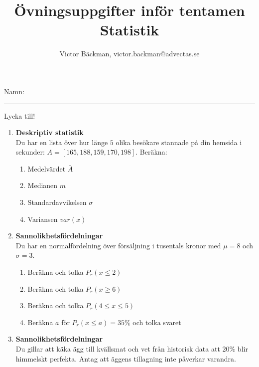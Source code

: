 \documentclass[a4paper,10pt]{article}
\title{Övningsuppgifter inför tentamen\\ Statistik}
\author{Victor Bäckman, victor.backman@advectas.se}
\begin{document}
\maketitle
\vspace{2cm}
Namn:
{\rule{13cm}{0.4pt}}
\vspace{5cm}
\begin{center}
  {\huge Lycka till!}
\end{center}

\newpage
\begin{enumerate}
    \item{{\bf Deskriptiv statistik} \\ Du har en lista över hur länge $5$ olika besökare stannade på din hemsida i sekunder: $A=[165, 188, 159, 170, 198]$. Beräkna:}
    \begin{enumerate}
      \item{Medelvärdet $\bar{A}$}
      \vspace{3cm}
      \item{Medianen $m$}
      \vspace{3cm}
      \item{Standardavvikelsen $\sigma$}
      \vspace{3cm}
      \item{Variansen $var(x)$}
    \end{enumerate}
    \newpage
    \item{{\bf Sannolikhetsfördelningar} \\ Du har en normalfördelning över försäljning i tusentals kronor med $\mu = 8$ och $\sigma=3$.}
    \begin{enumerate}
      \item{Beräkna och tolka $P_r(x \leq 2)$}
      \vspace{6cm}
      \item{Beräkna och tolka $P_r(x \geq 6)$}
      \vspace{6cm}
      \item{Beräkna och tolka $P_r(4 \leq x \leq 5)$}
      \newpage
      \item{Beräkna $a$ för $P_r(x \leq a) = 35\%$ och tolka svaret}
    \end{enumerate}
    \newpage
    \item{{\bf Sannolikhetsfördelningar}\\ Du gillar att käka ägg till kvällsmat och vet från historisk data att $20\%$ blir himmelskt perfekta. Antag att äggens tillagning inte påverkar varandra.}
    \begin{enumerate}\label{egg}

\end{enumerate}
\end{enumerate}
\end{document}
